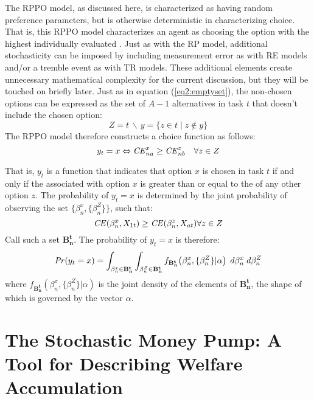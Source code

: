 \documentclass[../main.tex]{subfiles}
\begin{document}
The RPPO model, as discussed here, is characterized as having random preference parameters, but is otherwise deterministic in characterizing choice.
That is, this RPPO model characterizes an agent as choosing the option with the highest individually evaluated {\CE}.
Just as with the RP model, additional stochasticity can be imposed by including measurement error as with RE models and/or a tremble event as with TR models.
These additional elements create unnecessary mathematical complexity for the current discussion, but they will be touched on briefly later.
Just as in equation (\ref{eq2:emptyset}), the non-chosen options can be expressed as the set of $A-1$ alternatives in task $t$ that doesn't include the chosen option:
\begin{equation}
	\label{eq2:RPPO:emptyset}
	Z = t \,\backslash\, y = \{z \in t \;|\; z \notin y \}
\end{equation}
\noindent The RPPO model therefore constructs a choice function as follows:
\begin{equation}
	\label{RPPO.y0}
	y_t = x \Leftrightarrow {\ensuremath{\mathit{CE}}}_{na}^x \geq {\ensuremath{\mathit{CE}}}_{nb}^z \quad \forall z \in Z
\end{equation}

That is, $y_t$ is a function that indicates that option $x$ is chosen in task $t$ if and only if the {\CE} associated with option $x$ is greater than or equal to the {\CE} of any other option $z$.
The probability of $y_t = x$ is determined by the joint probability of observing the set $\bigl\{\beta_n^x,\{\beta_n^Z\}\bigr\}$, such that:
\begin{equation}
	\label{eq2:RPPO.y1}
	{\ensuremath{\mathit{CE}}}(\beta_n^x,X_{1t}) \geq {\ensuremath{\mathit{CE}}}(\beta_n^z,X_{at}) \forall z \in Z
\end{equation}
\noindent Call such a set $\mathbf{B^t_n}$.
The probability of $y_t=x$ is therefore:
\begin{equation}
	{\ensuremath{\mathit{Pr}}}(y_t=x) = \int_{\beta_n^x \in \mathbf{B^t_n}}\int_{\beta_n^Z \in \mathbf{B^t_n}} f_{\mathbf{B^t_n}}\!\left(\beta_n^x,\{\beta_n^Z\}|\alpha\right) \;d\beta_n^x \; d\beta_n^Z
\end{equation}
\noindent where $f_{\mathbf{B^t_n}}(\beta_n^x,\{\beta_n^Z\}|\alpha)$ is the joint density of the elements of $\mathbf{B^t_n}$, the shape of which is governed by the vector $\alpha$.

\singlespacing
\section[The Stochastic Money Pump: A Tool for Describing Welfare Accumulation]{The Stochastic Money Pump: A Tool for Describing Welfare Accumulation}
\doublespacing
\end{document}
